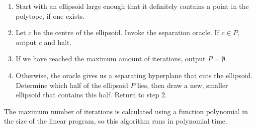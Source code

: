 \documentclass[12pt]{article}
\theoremstyle{plain}
\begin{document}
\begin{enumerate}
    \item Start with an ellipsoid large enough that it definitely contains a point in the polytope, if one exists.
    \item Let $c$ be the centre of the ellipsoid. Invoke the separation oracle. If $c\in P$, output $c$ and halt.
    \item If we have reached the maximum amount of iterations, output $P = \emptyset$.
    \item Otherwise, the oracle gives us a separating hyperplane that cuts the ellipsoid. Determine which half of the ellipsoid $P$ lies, then draw a new, smaller ellipsoid that contains this half. Return to step 2.
\end{enumerate}
The maximum number of iterations is calculated using a function polynomial in the size of the linear program, so this algorithm runs in polynomial time.
\end{document}
